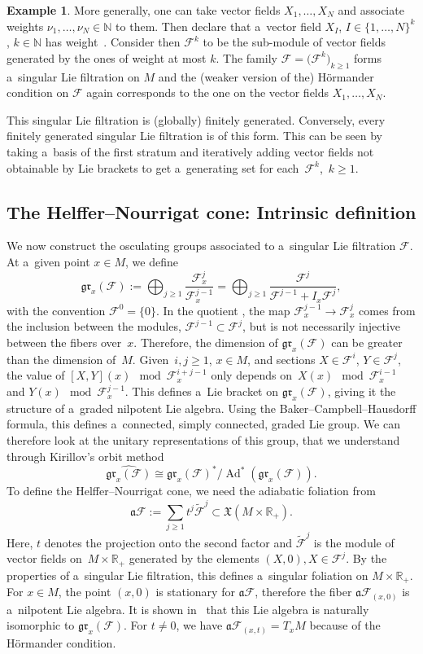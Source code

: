 \documentclass[10pt,a4paper]{article}
\newcommand{\R}{\mathbb R} %
\newcommand{\N}{\mathbb N} %
\newcommand{\F}{\mathcal{F}} %
\newcommand{\Ad}{\operatorname{Ad}} %
\newcommand{\adiab}{\mathfrak{a}} %
\newcommand{\Fb}{\mathcal{F}} %
\newcommand{\gr}{\mathfrak{gr}} %
\numberwithin{equation}{section}
\theoremstyle{definition}
\newtheorem{ex}[thm]{Example}
\begin{document}
\begin{ex}\label{Example : Finitely generated}
 More generally, one can take vector fields $X_1, \dots, X_N$ and associate weights $\nu_1,\dots,\nu_N \in \N$ to them. Then declare that a~vector field $X_I$, $I\in \{1,\dots,N\}^k$, $k\in \N$ has weight~. Consider then $\F^k$ to be the sub-module of vector fields generated by the ones of weight at most $k$. The family $\F = \bigl(\F^k\bigr)_{k\geq 1}$ forms a~singular Lie filtration on $M$ and the (weaker version of the) H\"ormander condition on $\F$ again corresponds to the one on the vector fields $X_1, \dots, X_N$.

 This singular Lie filtration is (globally) finitely generated. Conversely, every finitely generated singular Lie filtration is of this form. This can be seen by taking a~basis of the first stratum and iteratively adding vector fields not obtainable by Lie brackets to get a~generating set for each~$\F^k$,~$k\geq 1$.
\end{ex}


\subsection{The Helffer--Nourrigat cone: Intrinsic definition}

We now construct the osculating groups associated to a~singular Lie filtration $\Fb$. At a~given point $x\in M$, we define
\[\gr_x(\Fb):= \bigoplus_{j\geq 1} \frac{\F^j_x}{\F^{j-1}_x} = \bigoplus_{j\geq 1} \frac{\F^j}{\F^{j-1} + I_x\F^j},\]
with the convention $\F^0 = \{0\}$.
In the quotient \smash{$\frac{\F^j_x}{\F^{j-1}_x}$}, the map $\F^{j-1}_x \to \F^j_x$ comes from the inclusion between the modules, $\F^{j-1}\subset \F^j$, but is not necessarily injective between the fibers over~$x$. Therefore, the dimension of $\gr_x(\Fb)$ can be greater than the dimension of~$M$.
Given~${i,j\geq 1}$, $x\in M$, and sections $X\in \F^i$, $Y\in \F^j$, the value of $[X,Y](x) \mod \F_x^{i+j-1}$ only depends on~${X(x) \mod \F_x^{i-1}}$ and $Y(x) \mod \F_x^{j-1}$. This defines a~Lie bracket on $\gr_x(\Fb)$, giving it the structure of a~graded nilpotent Lie algebra. Using the Baker--Campbell--Hausdorff formula, this defines a~connected, simply connected, graded Lie group. We can therefore look at the unitary representations of this group, that we understand through Kirillov's orbit method~\cite{Kirillov}
\[\widehat{\gr_x(\Fb)} \cong {\gr_x(\Fb)^*}/{\Ad^*(\gr_x(\Fb))}.\]
To define the Helffer--Nourrigat cone, we need the adiabatic foliation from~\cite{AMYMaximalHypoellipticity}
\[\adiab\F := \sum_{j\geq 1} t^j\widetilde{\F}^j \subset \mathfrak{X}(M\times \R_+).\]
Here, $t$ denotes the projection onto the second factor and $\widetilde{\F}^j$ is the module of vector fields on~${M\times \R_+}$ generated by the elements $(X,0), X \in \F^j$. By the properties of a~singular Lie filtration, this defines a~singular foliation on $M \times \R_+$. For $x\in M$, the point $(x,0)$ is stationary for $\adiab\F$, therefore the fiber $\adiab\F_{(x,0)}$ is a~nilpotent Lie algebra. It is shown in~\cite[Proposition 1.6]{AMYMaximalHypoellipticity} that this Lie algebra is naturally isomorphic to $\gr_x(\Fb)$. For $t \neq 0$, we have $\adiab\F_{(x,t)} = T_xM$ because of the H\"ormander condition.
\end{document}
